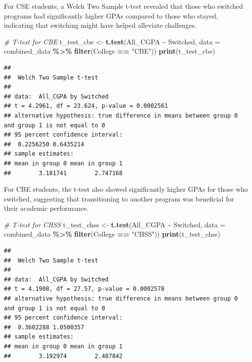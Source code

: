 \documentclass[
  12pt,
]{article}
\newenvironment{Shaded}{\begin{snugshade}}{\end{snugshade}}
\newcommand{\AttributeTok}[1]{\textcolor[rgb]{0.13,0.29,0.53}{#1}}
\newcommand{\CommentTok}[1]{\textcolor[rgb]{0.56,0.35,0.01}{\textit{#1}}}
\newcommand{\FunctionTok}[1]{\textcolor[rgb]{0.13,0.29,0.53}{\textbf{#1}}}
\newcommand{\NormalTok}[1]{#1}
\newcommand{\OtherTok}[1]{\textcolor[rgb]{0.56,0.35,0.01}{#1}}
\newcommand{\SpecialCharTok}[1]{\textcolor[rgb]{0.81,0.36,0.00}{\textbf{#1}}}
\newcommand{\StringTok}[1]{\textcolor[rgb]{0.31,0.60,0.02}{#1}}
\begin{document}
For CSE students, a Welch Two Sample t-test revealed that those who
switched programs had significantly higher GPAs compared to those who
stayed, indicating that switching might have helped alleviate
challenges.

\begin{Shaded}
\begin{Highlighting}[]
\CommentTok{\# T{-}test for CBE}
\NormalTok{t\_test\_cbe }\OtherTok{\textless{}{-}} \FunctionTok{t.test}\NormalTok{(All\_CGPA }\SpecialCharTok{\textasciitilde{}}\NormalTok{ Switched, }\AttributeTok{data =}\NormalTok{ combined\_data }\SpecialCharTok{\%\textgreater{}\%}
    \FunctionTok{filter}\NormalTok{(College }\SpecialCharTok{==} \StringTok{"CBE"}\NormalTok{))}
\FunctionTok{print}\NormalTok{(t\_test\_cbe)}
\end{Highlighting}
\end{Shaded}

\begin{verbatim}
## 
##  Welch Two Sample t-test
## 
## data:  All_CGPA by Switched
## t = 4.2961, df = 23.624, p-value = 0.0002561
## alternative hypothesis: true difference in means between group 0 and group 1 is not equal to 0
## 95 percent confidence interval:
##  0.2256250 0.6435214
## sample estimates:
## mean in group 0 mean in group 1 
##        3.181741        2.747168
\end{verbatim}

For CBE students, the t-test also showed significantly higher GPAs for
those who switched, suggesting that transitioning to another program was
beneficial for their academic performance.

\begin{Shaded}
\begin{Highlighting}[]
\CommentTok{\# T{-}test for CHSS}
\NormalTok{t\_test\_chss }\OtherTok{\textless{}{-}} \FunctionTok{t.test}\NormalTok{(All\_CGPA }\SpecialCharTok{\textasciitilde{}}\NormalTok{ Switched, }\AttributeTok{data =}\NormalTok{ combined\_data }\SpecialCharTok{\%\textgreater{}\%}
    \FunctionTok{filter}\NormalTok{(College }\SpecialCharTok{==} \StringTok{"CHSS"}\NormalTok{))}
\FunctionTok{print}\NormalTok{(t\_test\_chss)}
\end{Highlighting}
\end{Shaded}

\begin{verbatim}
## 
##  Welch Two Sample t-test
## 
## data:  All_CGPA by Switched
## t = 4.1908, df = 27.57, p-value = 0.0002578
## alternative hypothesis: true difference in means between group 0 and group 1 is not equal to 0
## 95 percent confidence interval:
##  0.3602288 1.0500357
## sample estimates:
## mean in group 0 mean in group 1 
##        3.192974        2.487842
\end{verbatim}
\end{document}
